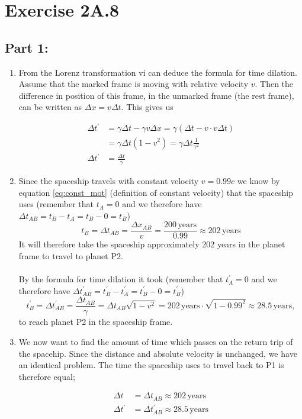 \documentclass[a4paper,10pt,english]{article}
\begin{document}
\section*{Exercise 2A.8}


\subsection*{Part 1:}

\begin{enumerate}
\item From the Lorenz transformation vi can deduce the formula for time dilation. Assume that the marked frame is moving with relative velocity $v$. Then the difference in position of this frame, in the unmarked frame (the rest frame), can be written as $\Delta x=v\Delta t$. This gives us

\begin{align*}
\Delta t^{\prime}&=\gamma \Delta t-\gamma v\Delta x=\gamma\left(\Delta t-v\cdot v\Delta t\right)\\
&=\gamma\Delta t\left(1-v^{2}\right)=\gamma\Delta t\frac{1}{\gamma^{2}}\\
\Delta t^{\prime}&=\frac{\Delta t}{\gamma}
\end{align*}

\item Since the spaceship travels with constant velocity $v=0.99c$ we know by equation \ref{eq:const_mot} (definition of constant velocity) that the spaceship uses (remember that $t_{A}=0$ and we therefore have $\Delta t_{AB}=t_{B}-t_{A}=t_{B}-0=t_{B}$) 
\[
t_{B}=\Delta t_{AB}=\frac{\Delta x_{AB}}{v}=\frac{200\,\text{years}}{0.99}\approx202\,\text{years}
\] 
It will therefore take the spaceship approximately 202 years in the planet frame to travel to planet P2.
\\
\\ 
By the formula for time dilation it took (remember that $t^{\prime}_{A}=0$ and we therefore have $\Delta t^{\prime}_{AB}=t^{\prime}_{B}-t^{\prime}_{A}=t^{\prime}_{B}-0=t^{\prime}_{B}$) 
\[
t^{\prime}_{B}=\Delta t^{\prime}_{AB}=\dfrac{\Delta t_{AB}}{\gamma}=\Delta t_{AB}\sqrt{1-v^2}=202\,\text{years}\cdot\sqrt{1-0.99^2}\approx28.5\,\text{years},
\] 
to reach planet P2 in the spaceship frame.
\item We now want to find the amount of time which passes on the return trip of the spacehip. Since the distance and absolute velocity is unchanged, we have an identical problem. The time the spaceship uses to travel back to P1 is therefore equal; 

\begin{align*}
\Delta t&=\Delta t_{AB}\approx202\,\text{years}\\
\Delta t^{\prime}&=\Delta t^{\prime}_{AB}\approx28.5\,\text{years}
\end{align*}

\end{enumerate}
\end{document}
